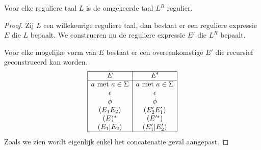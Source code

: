 \documentclass[main.tex]{subfiles}
\begin{document}
\begin{st}
  \label{omgekeerde-reguliere-taal-is-regulier}
  Voor elke reguliere taal $L$ is de omgekeerde taal $L^{R}$ regulier.

  \begin{proof}
    Zij $L$ een willekeurige reguliere taal, dan bestaat er een reguliere expressie $E$ die $L$ bepaalt.
    We construeren nu de reguliere expressie $E'$ die $L^{R}$ bepaalt.
    
    Voor elke mogelijke vorm van $E$ bestaat er een overeenkomstige $E'$ die recursief geconstrueerd kan worden.
    \[
    \begin{array}{|c|c|}
      \hline
      E                           & E'\\
      \hline
      a \text{ met } a \in \Sigma & a \text{ met } a \in \Sigma\\
      \epsilon                    & \epsilon\\
      \phi                        & \phi\\
      (E_1E_2)                    & (E_{2}'E_{1}')\\
      (E)^{*}                      & (E'^{*})\\
      (E_1|E_2)                   & (E_1'|E_2')\\
      \hline
    \end{array}
    \]
    Zoals we zien wordt eigenlijk enkel het concatenatie geval aangepast. 
  \end{proof}
\end{st}
\end{document}
